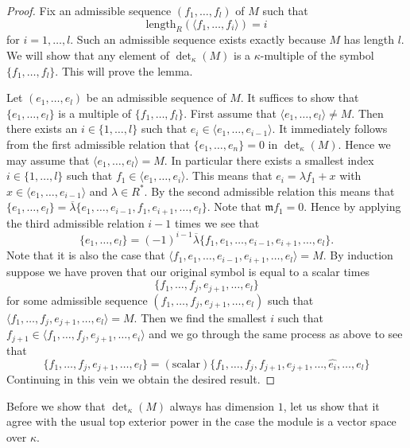 \begin{proof}
Fix an admissible sequence $(f_1, \ldots, f_l)$ of $M$ such that
$$
\text{length}_R(\langle f_1, \ldots, f_i\rangle) = i
$$
for $i = 1, \ldots, l$. Such an admissible sequence exists exactly because
$M$ has length $l$. We will show that any element of 
$\det_\kappa(M)$ is a $\kappa$-multiple of the symbol
$\{f_1, \ldots, f_l\}$. This will prove the lemma.

\medskip\noindent
Let $(e_1, \ldots, e_l)$ be an admissible sequence of $M$.
It suffices to show that $\{e_1, \ldots, e_l\}$ is a multiple
of $\{f_1, \ldots, f_l\}$. First assume that
$\langle e_1, \ldots, e_l\rangle \not = M$. Then there exists
an $i \in \{1, \ldots, l\}$ such that
$e_i \in \langle e_1, \ldots, e_{i - 1}\rangle$. It immediately
follows from the first admissible relation that
$\{e_1, \ldots, e_n\} = 0$ in $\det_\kappa(M)$.
Hence we may assume that $\langle e_1, \ldots, e_l\rangle = M$.
In particular there exists a smallest index $i \in \{1, \ldots, l\}$
such that $f_1 \in \langle e_1, \ldots, e_i\rangle$. This means
that $e_i = \lambda f_1 + x$ with
$x \in \langle e_1, \ldots, e_{i - 1}\rangle$ and $\lambda \in R^*$.
By the second admissible relation this means that
$\{e_1, \ldots, e_l\} = 
\overline{\lambda}\{e_1, \ldots, e_{i - 1}, f_1, e_{i + 1}, \ldots, e_l\}$.
Note that $\mathfrak m f_1 = 0$. Hence by applying the third
admissible relation $i - 1$ times we see that
$$
\{e_1, \ldots, e_l\} = 
(-1)^{i - 1}\overline{\lambda}
\{f_1, e_1, \ldots, e_{i - 1}, e_{i + 1}, \ldots, e_l\}.
$$
Note that it is also the case that
$ \langle f_1, e_1, \ldots, e_{i - 1}, e_{i + 1}, \ldots, e_l\rangle = M$.
By induction suppose we have proven that our original
symbol is equal to a scalar times
$$
\{f_1, \ldots, f_j, e_{j + 1}, \ldots, e_l\}
$$
for some admissible sequence $(f_1, \ldots, f_j, e_{j + 1}, \ldots, e_l)$
such that $\langle f_1, \ldots, f_j, e_{j + 1}, \ldots, e_l\rangle = M$.
Then we find the smallest $i$ such that
$f_{j + 1} \in \langle f_1, \ldots, f_j, e_{j + 1}, \ldots, e_i\rangle$
and we go through the same process as above to see that
$$
\{f_1, \ldots, f_j, e_{j + 1}, \ldots, e_l\}
=
(\text{scalar}) \{f_1, \ldots, f_j, f_{j + 1}, e_{j + 1},
\ldots, \hat{e_i}, \ldots, e_l\}
$$
Continuing in this vein we obtain the desired result.
\end{proof}

\noindent
Before we show that $\det_\kappa(M)$ always has dimension $1$,
let us show that it agree with the usual top exterior power in
the case the module is a vector space over $\kappa$.

